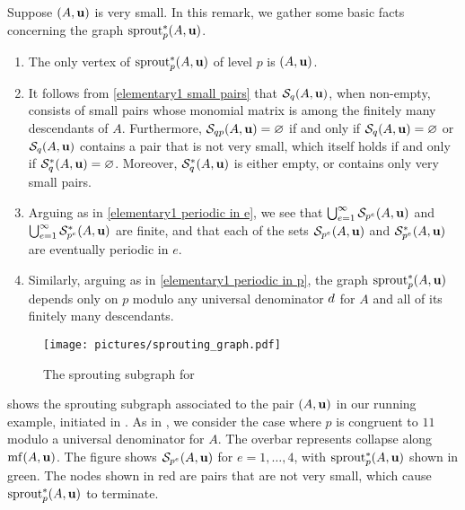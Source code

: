 \documentclass{amsart}
\begin{document}
\begin{remark}
   \label{elementary2: R}
   Suppose $(A,\mathbf{u})$ is very small.
   In this remark, we gather some basic facts concerning the graph $\operatorname{sprout}^{\ast}_p(A,\mathbf{u})$.
   \begin{enumerate}
      \item  \label{elementary2 lowest level}
      The only vertex of $\operatorname{sprout}_p^{\ast}(A,\mathbf{u})$ of level $p$ is $(A,\mathbf{u})$.
      \item \label{elementary2 small pairs}
      It follows from \eqref{elementary1 small pairs} that $\mathcal{S}_{q}(A,\mathbf{u})$, when non-empty, consists of small pairs whose monomial matrix is among the finitely many descendants of $A$.
      Furthermore, $\mathcal{S}_{qp}(A,\mathbf{u}) = \varnothing$ if and only if $\mathcal{S}_q(A,\mathbf{u}) = \varnothing$ or $\mathcal{S}_q(A,\mathbf{u})$ contains a pair that is not very small, which itself holds if and only if $\mathcal{S}_{q}^{\ast}(A,\mathbf{u})= \varnothing$.
      Moreover, $\mathcal{S}_q^{\ast}(A,\mathbf{u})$ is either empty, or contains only very small pairs.
      \item \label{elementary2 periodic in e}
      Arguing as in \eqref{elementary1 periodic in e}, we see that $\bigcup_{e=1}^{\infty} \mathcal{S}_{p^e}(A,\mathbf{u})$ and  $\bigcup_{e=1}^{\infty} \mathcal{S}^{\ast}_{p^e}(A,\mathbf{u})$ are finite, and that each of the sets $\mathcal{S}_{p^e}(A,\mathbf{u})$ and $\mathcal{S}^{\ast}_{p^e}(A,\mathbf{u})$ are eventually periodic in $e$.
      \item \label{elementary2 periodic in p}
      Similarly, arguing as in \eqref{elementary1 periodic in p}, the graph $\operatorname{sprout}_p^{\ast}(A,\mathbf{u})$ depends only on $p$ modulo any universal denominator $d$ for $A$  and all of its finitely many descendants.
   \end{enumerate}
\end{remark}

\begin{example}
   \label{ex: ft.4}
   \begin{figure}
      \centering
      \texttt{[image: pictures/sprouting\_graph.pdf]}
      \caption{The sprouting subgraph for }
      \label{fig: sprouting graph}
   \end{figure}
    shows the sprouting subgraph associated to the pair $(A,\mathbf{u})$ in our running example, initiated in .
   As in , we consider the case where $p$ is congruent to $11$ modulo a universal denominator for $A$.
   The overbar represents collapse along $\operatorname{mf}(A,\mathbf{u})$.
   The figure shows $\mathcal{S}_{p^e}(A,\mathbf{u})$ for $e=1,\ldots,4$, with $\operatorname{sprout}^*_p(A,\mathbf{u})$ shown in green.
   The nodes shown in red are pairs that are not very small, which cause $\operatorname{sprout}^*_p(A,\mathbf{u})$ to terminate.


\end{example}
\end{document}
